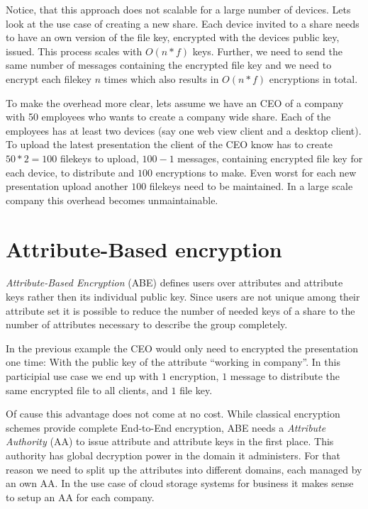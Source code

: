 Notice, that this approach does not scalable for a large number of devices. Lets look at the use case of creating a new share. Each device invited to a share needs to have an own version of the file key, encrypted with the devices public key, issued. This process scales with $O(n * f)$ keys. 
Further, we need to send the same number of messages containing the encrypted file key and we need to encrypt each filekey $n$ times which also results in $O(n * f)$ encryptions in total. 

To make the overhead more clear, lets assume we have an CEO of a company with 50 employees who wants to create a company wide share. Each of the employees has at least two devices (say one web view client and a desktop client). To upload the latest presentation the client of the CEO know has to create $50 * 2 = 100$ filekeys to upload, $100-1$ messages, containing encrypted file key for each device, to distribute and $100$ encryptions to make. Even worst for each new presentation upload another $100$ filekeys need to be maintained. In a large scale company this overhead becomes unmaintainable.

\section{Attribute-Based encryption}
\textit{Attribute-Based Encryption} (\ac{ABE}) defines users over attributes and attribute keys rather then its individual public key. Since users are not unique among their attribute set it is possible to reduce the number of needed keys of a share to the number of attributes necessary to describe the group completely. 

In the previous example the CEO would only need to encrypted the presentation one time: With the public key of the attribute “working in company”. In this participial use case we end up with $1$ encryption, $1$ message to distribute the same encrypted file to all clients, and $1$ file key. 

Of cause this advantage does not come at no cost. While classical encryption schemes provide complete End-to-End encryption, ABE needs a \textit{Attribute Authority} (\ac{AA}) to issue attribute and attribute keys in the first place. This authority has global decryption power in the domain it administers. For that reason we need to split up the attributes into different domains, each managed by an own AA. In the use case of cloud storage systems for business it makes sense to setup an AA for each company. 

